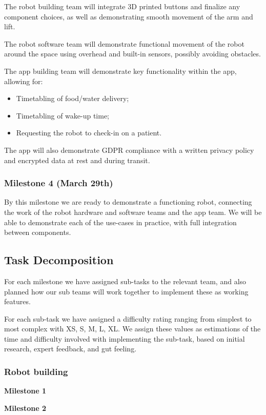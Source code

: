 \documentclass{article}
\begin{document}
The robot building team will integrate 3D printed buttons and finalize any component choices, as well as demonstrating smooth movement of the arm and lift. 

The robot software team will demonstrate functional movement of the robot around the space using overhead and built-in sensors, possibly avoiding obstacles. 

The app building team will demonstrate key functionality within the app, allowing for:
\begin{itemize}
\item Timetabling of food/water delivery;
\item Timetabling of wake-up time;
\item Requesting the robot to check-in on a patient.
\end{itemize}
The app will also demonstrate GDPR compliance with a written privacy policy and encrypted data at rest and during transit.

\subsubsection{Milestone 4 (March 29th)}
By this milestone we are ready to demonstrate a functioning robot, connecting the work of the robot hardware and software teams and the app team. We will be able to demonstrate each of the use-cases in practice, with full integration between components. 

\subsection{Task Decomposition}

For each milestone we have assigned sub-tasks to the relevant team, and also planned how our sub teams will work together to implement these as working features.

For each sub-task we have assigned a difficulty rating ranging from simplest to most complex with XS, S, M, L, XL. We assign these values as estimations of the time and difficulty involved with implementing the sub-task, based on initial research, expert feedback, and gut feeling. 


\subsubsection{Robot building}

{\bf Milestone 1}

{\bf Milestone 2}
\end{document}

